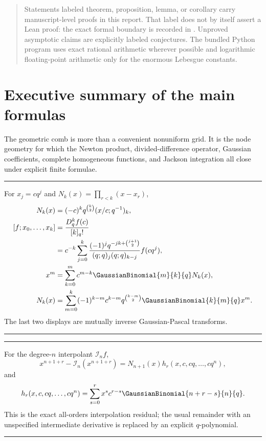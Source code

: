 \documentclass[11pt,oneside]{book}
\numberwithin{equation}{chapter}
\theoremstyle{definition}
\theoremstyle{remark}
\newcommand{\Interp}{\mathcal I}
\newenvironment{resultbox}
{\par\medskip\noindent\begin{center}\begin{minipage}{0.94\textwidth}\hrule\medskip}
{\medskip\hrule\end{minipage}\end{center}\medskip}
\begin{document}
\begin{quote}
Statements labeled theorem, proposition, lemma, or corollary carry
manuscript-level proofs in this report.  That label does not by itself assert
a Lean proof: the exact formal boundary is recorded in
.  Unproved asymptotic claims are
explicitly labeled conjectures.  The bundled Python program uses exact
rational arithmetic wherever possible and logarithmic floating-point
arithmetic only for the enormous Lebesgue constants.
\end{quote}

\chapter*{Executive summary of the main formulas}

The geometric comb is more than a convenient nonuniform grid.  It is the
node geometry for which the Newton product, divided-difference operator,
Gaussian coefficients, complete homogeneous functions, and Jackson
integration all close under explicit finite formulae.

\begin{resultbox}
For $x_j=cq^j$ and $N_k(x)=\prod_{r<k}(x-x_r)$,
\begin{align*}
 N_k(x)&=(-c)^kq^{\binom k2}(x/c;q^{-1})_k,\\
 [f;x_0,\ldots,x_k]
 &=\frac{D_q^kf(c)}{[k]_q!}\\
 &=c^{-k}\sum_{j=0}^k
 \frac{(-1)^jq^{-jk+\binom{j+1}{2}}}
 {(q;q)_j(q;q)_{k-j}}f(cq^j),\\
 x^m&=\sum_{k=0}^m c^{m-k}\GaussianBinomial{m}{k}{q}N_k(x),\\
 N_k(x)&=\sum_{m=0}^k(-1)^{k-m}c^{k-m}
 q^{\binom{k-m}{2}}\GaussianBinomial{k}{m}{q}x^m.
\end{align*}
The last two displays are mutually inverse Gaussian-Pascal transforms.
\end{resultbox}

\begin{resultbox}
For the degree-$n$ interpolant $\Interp_nf$,
\[
 x^{n+1+r}-\Interp_n(x^{n+1+r})
 =N_{n+1}(x)h_r(x,c,cq,\ldots,cq^n),
\]
and
\[
 h_r(x,c,cq,\ldots,cq^n)
 =\sum_{s=0}^r x^s c^{r-s}\GaussianBinomial{n+r-s}{n}{q}.
\]
This is the exact all-orders interpolation residual; the usual remainder
with an unspecified intermediate derivative is replaced by an explicit
$q$-polynomial.
\end{resultbox}
\end{document}

